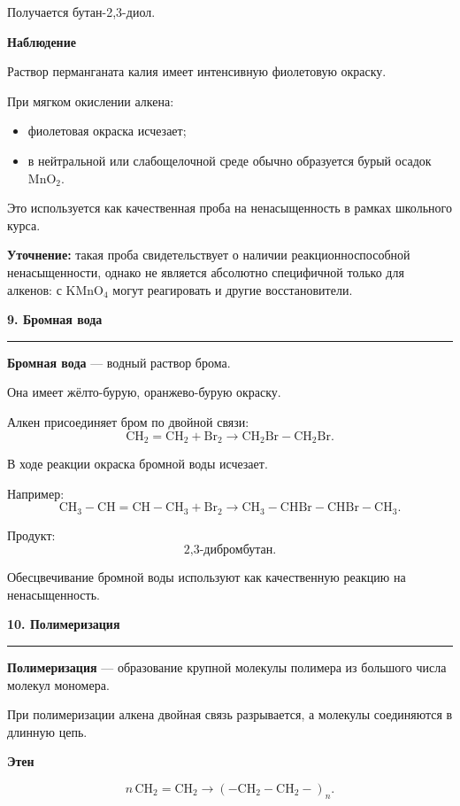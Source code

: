 \documentclass[a4paper,12pt]{article}
\newcommand{\topic}[1]{%
    \vspace{0.5em}
    {\Large\bfseries\textcolor{darkaccent}{#1}}\par
    \vspace{0.25em}
    {\color{accent}\rule{\linewidth}{0.7pt}}
    \vspace{0.4em}
}
\newcommand{\subtopic}[1]{%
    \vspace{0.35em}
    {\large\bfseries\textcolor{accent}{#1}}\par
}
\newcommand{\important}[1]{\textbf{\textcolor{darkaccent}{#1}}}
\begin{document}
Получается бутан-2,3-диол.

\subtopic{Наблюдение}

Раствор перманганата калия имеет интенсивную фиолетовую окраску.

При мягком окислении алкена:

\begin{itemize}
    \item фиолетовая окраска исчезает;
    \item в нейтральной или слабощелочной среде обычно образуется бурый осадок
    \(\mathrm{MnO_2}\).
\end{itemize}

Это используется как качественная проба на ненасыщенность в рамках школьного курса.

\important{Уточнение:} такая проба свидетельствует о наличии реакционноспособной ненасыщенности, однако не является абсолютно специфичной только для алкенов: с \(\mathrm{KMnO_4}\) могут реагировать и другие восстановители.


\topic{9. Бромная вода}

\important{Бромная вода} --- водный раствор брома.

Она имеет жёлто-бурую, оранжево-бурую окраску.

Алкен присоединяет бром по двойной связи:
\[
\mathrm{CH_2=CH_2+Br_2}
\longrightarrow
\mathrm{CH_2Br-CH_2Br}.
\]

В ходе реакции окраска бромной воды исчезает.

Например:
\[
\mathrm{CH_3-CH=CH-CH_3+Br_2}
\longrightarrow
\mathrm{CH_3-CHBr-CHBr-CH_3}.
\]

Продукт:
\[
\boxed{\text{2,3-дибромбутан}}.
\]

Обесцвечивание бромной воды используют как качественную реакцию на ненасыщенность.


\topic{10. Полимеризация}

\important{Полимеризация} --- образование крупной молекулы полимера из большого числа молекул мономера.

При полимеризации алкена двойная связь разрывается, а молекулы соединяются в длинную цепь.

\subtopic{Этен}

\[
n\,\mathrm{CH_2=CH_2}
\longrightarrow
\left(
\mathrm{-CH_2-CH_2-}
\right)_n.
\]
\end{document}

